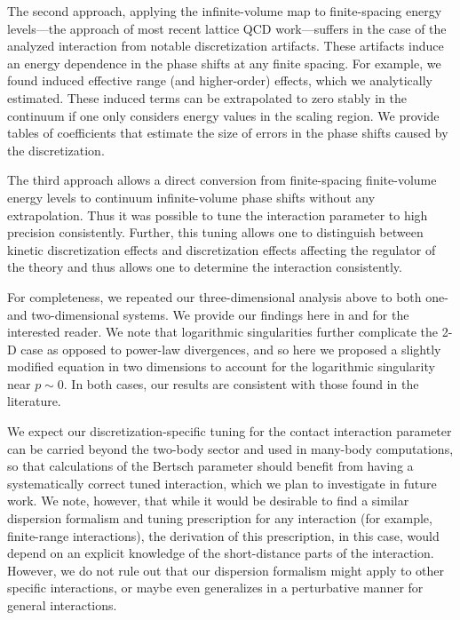 The second approach, applying the infinite-volume map to finite-spacing energy levels---the approach of most recent lattice QCD work---suffers in the case of the analyzed interaction from notable discretization artifacts.
These artifacts induce an energy dependence in the phase shifts at any finite spacing.
For example, we found induced effective range (and higher-order) effects, which we analytically estimated.
These induced terms can be extrapolated to zero stably in the continuum if one only considers energy values in the scaling region.
We provide tables of coefficients that estimate the size of errors in the phase shifts caused by the discretization.

The third approach allows a direct conversion from finite-spacing finite-volume energy levels to continuum infinite-volume phase shifts without any extrapolation.
Thus it was possible to tune the interaction parameter to high precision consistently.
Further, this tuning allows one to distinguish between kinetic discretization effects and discretization effects affecting the regulator of the theory and thus allows one to determine the interaction consistently.

For completeness, we repeated our three-dimensional analysis above to both one- and two-dimensional systems.  We provide our findings here in  and  for the interested reader.
We note that logarithmic singularities further complicate the 2-D case as opposed to power-law divergences, and so here we proposed a slightly modified \Luscher equation in two dimensions to account for the logarithmic singularity near $p\sim 0$.
In both cases, our results are consistent with those found in the literature.

We expect our discretization-specific tuning for the contact interaction parameter can be carried beyond the two-body sector and used in many-body computations, so that calculations of the Bertsch parameter should benefit from having a systematically correct tuned interaction, which we plan to investigate in future work.
We note, however, that while it would be desirable to find a similar dispersion formalism and tuning prescription for any interaction (for example, finite-range interactions), the derivation of this prescription, in this case, would depend on an explicit knowledge of the short-distance parts of the interaction.
However, we do not rule out that our dispersion formalism might apply to other specific interactions, or maybe even generalizes in a perturbative manner for general interactions.
